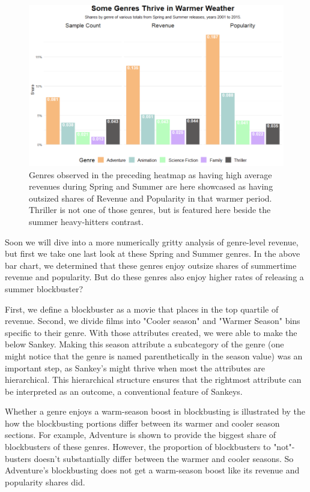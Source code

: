 \documentclass[12pt]{article}
\begin{document}
\begin{figure}[h!]
    \centering
    \includegraphics[width=1\textwidth]{images/genres_thrive_warmer_weather.png}
    \caption{Genres observed in the preceding heatmap as having high average revenues during Spring and Summer are here showcased as having outsized shares of Revenue and Popularity in that warmer period. Thriller is not one of those genres, but is featured here beside the summer heavy-hitters contrast.}
    \label{fig:figure_4}
\end{figure}

Soon we will dive into a more numerically gritty analysis of genre-level revenue, but first we take one last look at these Spring and Summer genres. In the above bar chart, we determined that these genres enjoy outsize shares of summertime revenue and popularity. But do these genres also enjoy higher rates of releasing a summer blockbuster?

First, we define a blockbuster as a movie that places in the top quartile of revenue. Second, we divide films into "Cooler season" and "Warmer Season" bins specific to their genre. With those attributes created, we were able to make the below Sankey. Making this season attribute a subcategory of the genre (one might notice that the genre is named parenthetically in the season value) was an important step, as Sankey's might thrive when most the attributes are hierarchical. This hierarchical structure ensures that the rightmost attribute can be interpreted as an outcome, a conventional feature of Sankeys.

Whether a genre enjoys a warm-season boost in blockbusting is illustrated by the how the blockbusting portions differ between its warmer and cooler season sections. For example, Adventure is shown to provide the biggest share of blockbusters of these genres. However, the proportion of blockbusters to "not"-busters doesn't substantially differ between the warmer and cooler seasons. So Adventure's blockbusting does not get a warm-season boost like its revenue and popularity shares did.
\end{document}

